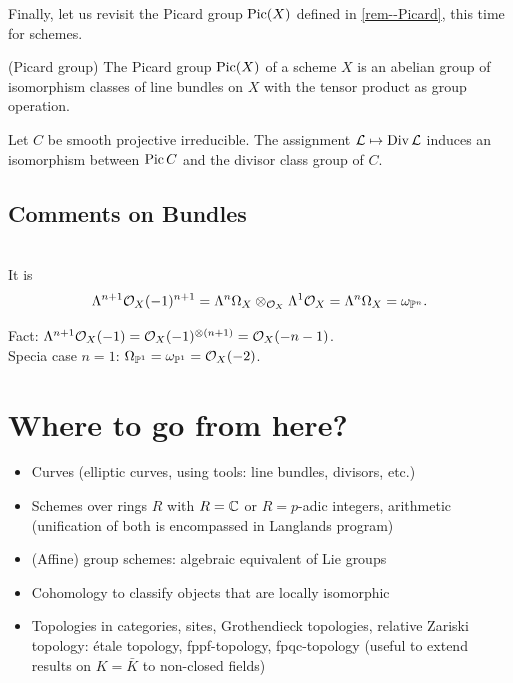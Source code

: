 \documentclass[a4paper,11pt]{article}
\begin{document}
			Finally, let us revisit the Picard group $\operatorname{Pic}(X)$ defined in \autoref{rem--Picard}, this time for schemes. 

			\begin{defi}
				(Picard group) The Picard group $\operatorname{Pic}(X)$ of a scheme $X$ is an abelian group of isomorphism classes of line bundles on $X$ with the tensor product as group operation.
			\end{defi}

			\begin{prop}
				Let $C$ be smooth projective irreducible. The assignment $\mathcal{L}\mapsto\operatorname{Div}\mathcal{L}$ induces an isomorphism between $\operatorname{Pic} C$ and the divisor class group of $C$.
			\end{prop}


			{\color{gray}\subsection*{Comments on Bundles}
			
				\begin{thm}
					\phantom{k}\\It is
					\begin{equation*}
						\Lambda^{n+1}\mathcal{O}_X(-1)^{n+1}=\Lambda^n\Omega_X\otimes_{\mathcal{O}_X}\Lambda^1\mathcal{O}_X=\Lambda^n\Omega_X=\omega_{\mathbb{P}^n}.
					\end{equation*}
				\end{thm}

				\noindent Fact: $\Lambda^{n+1}\mathcal{O}_X(-1)=\mathcal{O}_X(-1)^{\otimes(n+1)}=\mathcal{O}_X(-n-1)$.
				\\

				\noindent Specia case $n=1$: $\Omega_{\mathbb{P}^1}=\omega_{\mathbb{P}^1}=\mathcal{O}_X(-2)$.
			
			}




			
			


	\newpage
	\section*{Where to go from here?}

		\begin{itemize}
			\item Curves (elliptic curves, using tools: line bundles, divisors, etc.)
			\item Schemes over rings $R$ with $R=\mathbb{C}$ or $R=p$-adic integers, arithmetic (unification of both is encompassed in Langlands program)
			\item (Affine) group schemes: algebraic equivalent of Lie groups
			\item Cohomology to classify objects that are locally isomorphic 
			\item Topologies in categories, sites, Grothendieck topologies, relative Zariski topology: étale topology, fppf-topology, fpqc-topology (useful to extend results on $K=\bar{K}$ to non-closed fields)
		\end{itemize}
\end{document}
